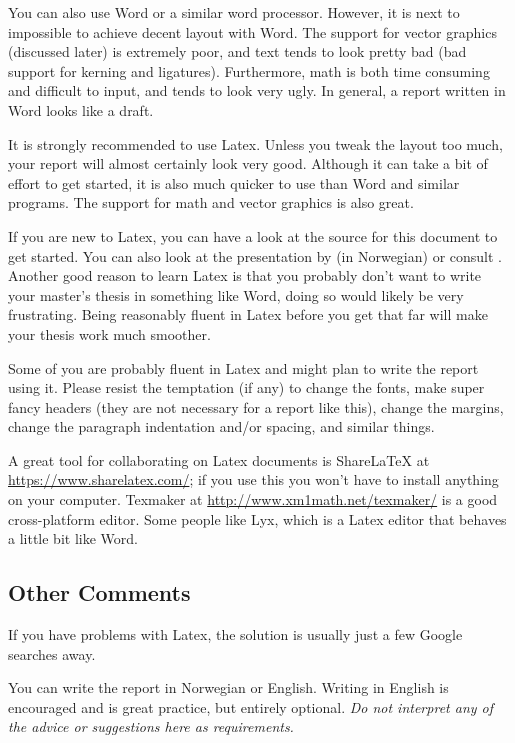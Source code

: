 You can also use Word or a similar word processor. However, it is next to impossible to achieve decent layout with Word. The support for vector graphics (discussed later) is extremely poor, and text tends to look pretty bad (bad support for kerning and ligatures). Furthermore, math is both time consuming and difficult to input, and tends to look very ugly. In general, a report written in Word looks like a draft.

It is strongly recommended to use Latex. Unless you tweak the layout too much, your report will almost certainly look very good. Although it can take a bit of effort to get started, it is also much quicker to use than Word and similar programs. The support for math and vector graphics is also great.

If you are new to Latex, you can have a look at the source for this document to get started. You can also look at the presentation by \citet{Berland2010} (in Norwegian) or consult \citet{Oetiker2011}. Another good reason to learn Latex is that you probably don't want to write your master's thesis in something like Word, doing so would likely be very frustrating. Being reasonably fluent in Latex before you get that far will make your thesis work much smoother.

Some of you are probably fluent in Latex and might plan to write the report using it. Please resist the temptation (if any) to change the fonts, make super fancy headers (they are not necessary for a report like this), change the margins, change the paragraph indentation and/or spacing, and similar things.

A great tool for collaborating on Latex documents is ShareLaTeX at \url{https://www.sharelatex.com/}; if you use this you won't have to install anything on your computer. Texmaker at \url{http://www.xm1math.net/texmaker/} is a good cross-platform editor. Some people like Lyx, which is a Latex editor that behaves a little bit like Word.

\subsection{Other Comments}
If you have problems with Latex, the solution is usually just a few Google searches away.

You can write the report in Norwegian or English. Writing in English is encouraged and is great practice, but entirely optional. \emph{Do not interpret any of the advice or suggestions here as requirements.}

